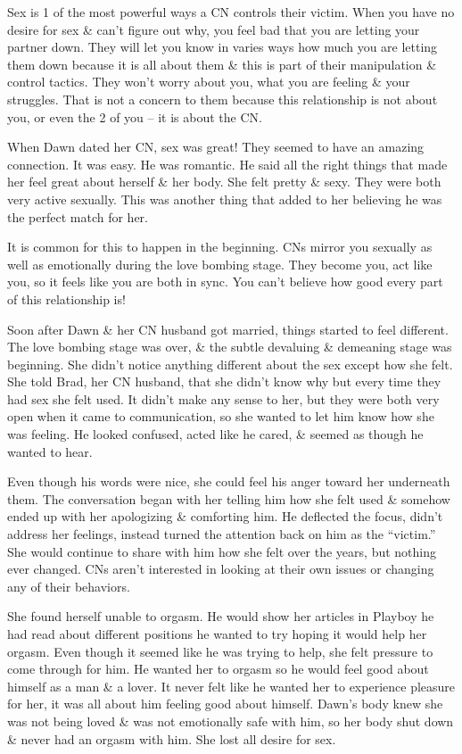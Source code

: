 \documentclass{article}
\numberwithin{equation}{section}
\begin{document}
Sex is 1 of the most powerful ways a CN controls their victim. When you have no desire for sex \& can't figure out why, you feel bad that you are letting your partner down. They will let you know in varies ways how much you are letting them down because it is all about them \& this is part of their manipulation \& control tactics. They won't worry about you, what you are feeling \& your struggles. That is not a concern to them because this relationship is not about you, or even the 2 of you -- it is about the CN.

When Dawn dated her CN, sex was great! They seemed to have an amazing connection. It was easy. He was romantic. He said all the right things that made her feel great about herself \& her body. She felt pretty \& sexy. They were both very active sexually. This was another thing that added to her believing he was the perfect match for her.

It is common for this to happen in the beginning. CNs mirror you sexually as well as emotionally during the love bombing stage. They become you, act like you, so it feels like you are both in sync. You can't believe how good every part of this relationship is!

Soon after Dawn \& her CN husband got married, things started to feel different. The love bombing stage was over, \& the subtle devaluing \& demeaning stage was beginning. She didn't notice anything different about the sex except how she felt. She told Brad, her CN husband, that she didn't know why but every time they had sex she felt used. It didn't make any sense to her, but they were both very open when it came to communication, so she wanted to let him know how she was feeling. He looked confused, acted like he cared, \& seemed as though he wanted to hear.

Even though his words were nice, she could feel his anger toward her underneath them. The conversation began with her telling him how she felt used \& somehow ended up with her apologizing \& comforting him. He deflected the focus, didn't address her feelings, instead turned the attention back on him as the ``victim.'' She would continue to share with him how she felt over the years, but nothing ever changed. CNs aren't interested in looking at their own issues or changing any of their behaviors.

She found herself unable to orgasm. He would show her articles in Playboy he had read about different positions he wanted to try hoping it would help her orgasm. Even though it seemed like he was trying to help, she felt pressure to come through for him. He wanted her to orgasm so he would feel good about himself as a man \& a lover. It never felt like he wanted her to experience pleasure for her, it was all about him feeling good about himself. Dawn’s body knew she was not being loved \& was not emotionally safe with him, so her body shut down \& never had an orgasm with him. She lost all desire for sex.
\end{document}
